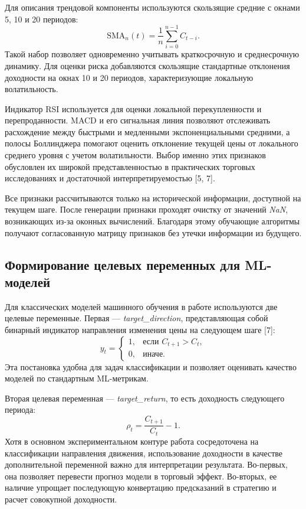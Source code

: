 Для описания трендовой компоненты используются скользящие средние с окнами 5, 10 и 20 периодов:
\begin{equation}
\text{SMA}_n(t) = \frac{1}{n} \sum_{i=0}^{n-1} C_{t-i}.
\end{equation}
Такой набор позволяет одновременно учитывать краткосрочную и среднесрочную динамику. Для оценки риска добавляются скользящие стандартные отклонения доходности на окнах 10 и 20 периодов, характеризующие локальную волатильность.

Индикатор RSI используется для оценки локальной перекупленности и перепроданности. MACD и его сигнальная линия позволяют отслеживать расхождение между быстрыми и медленными экспоненциальными средними, а полосы Боллинджера помогают оценить отклонение текущей цены от локального среднего уровня с учетом волатильности. Выбор именно этих признаков обусловлен их широкой представленностью в практических торговых исследованиях и достаточной интерпретируемостью [5, 7].

Все признаки рассчитываются только на исторической информации, доступной на текущем шаге. После генерации признаки проходят очистку от значений \textit{NaN}, возникающих из-за оконных вычислений. Благодаря этому обучающие алгоритмы получают согласованную матрицу признаков без утечки информации из будущего.

\subsection{Формирование целевых переменных для ML-моделей}

Для классических моделей машинного обучения в работе используются две целевые переменные. Первая — \textit{target\_direction}, представляющая собой бинарный индикатор направления изменения цены на следующем шаге [7]:
\begin{equation}
y_t =
\begin{cases}
1, & \text{если } C_{t+1} > C_t,\\
0, & \text{иначе.}
\end{cases}
\end{equation}
Эта постановка удобна для задач классификации и позволяет оценивать качество моделей по стандартным ML-метрикам.

Вторая целевая переменная — \textit{target\_return}, то есть доходность следующего периода:
\begin{equation}
\rho_t = \frac{C_{t+1}}{C_t} - 1.
\end{equation}
Хотя в основном экспериментальном контуре работа сосредоточена на классификации направления движения, использование доходности в качестве дополнительной переменной важно для интерпретации результата. Во-первых, она позволяет перевести прогноз модели в торговый эффект. Во-вторых, ее наличие упрощает последующую конвертацию предсказаний в стратегию и расчет совокупной доходности.

